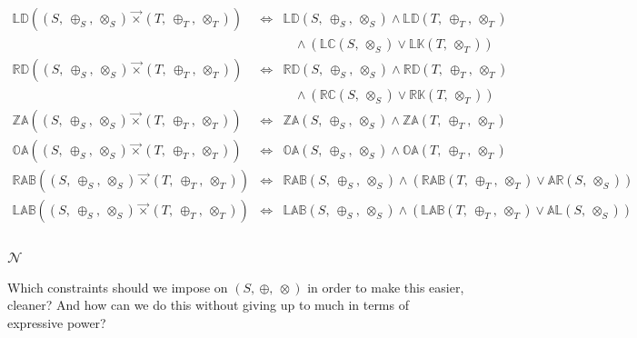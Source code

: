 \documentclass[10pt]{article}
\newcommand{\propname}[1]{{\mathbb{#1}}}
\newcommand{\lexprod}{\ensuremath{\mathbin{\vec{\times}}}}
\begin{document}
\[
\begin{array}{rcl} 
\propname{LD}((S,\ \oplus_S,\ \otimes_S) \lexprod (T,\ \oplus_T,\ \otimes_T)) 
   & \Leftrightarrow %
   & \propname{LD}(S,\ \oplus_S,\ \otimes_S) 
     \wedge \propname{LD}(T,\ \oplus_T,\ \otimes_T)\\ 
   & 
   & \ \ \ \ \wedge ( \propname{LC}(S,\ \otimes_S) \vee \propname{LK}(T,\ \otimes_T) )
  \\
\propname{RD}((S,\ \oplus_S,\ \otimes_S) \lexprod (T,\ \oplus_T,\ \otimes_T)) 
   & \Leftrightarrow %
  & \propname{RD}(S,\ \oplus_S,\ \otimes_S) 
    \wedge \propname{RD}(T,\ \oplus_T,\ \otimes_T) \\ 
   & 
   & \ \ \ \ \wedge ( \propname{RC}(S,\ \otimes_S) \vee \propname{RK}(T,\ \otimes_T) )
   \\ 
\propname{ZA}((S,\ \oplus_S,\ \otimes_S) \lexprod (T,\ \oplus_T,\ \otimes_T)) 
    & \Leftrightarrow %
    & \propname{ZA}(S,\ \oplus_S,\ \otimes_S) \wedge \propname{ZA}(T,\ \oplus_T,\ \otimes_T)
   \\
\propname{OA}((S,\ \oplus_S,\ \otimes_S) \lexprod (T,\ \oplus_T,\ \otimes_T)) 
    & \Leftrightarrow %
    & \propname{OA}(S,\ \oplus_S,\ \otimes_S) \wedge \propname{OA}(T,\ \oplus_T,\ \otimes_T)
   \\
\propname{RAB}((S,\ \oplus_S,\ \otimes_S) \lexprod (T,\ \oplus_T,\ \otimes_T)) 
    & \Leftrightarrow %
    & \propname{RAB}(S,\ \oplus_S,\ \otimes_S) \wedge  
      (\propname{RAB}(T,\ \oplus_T,\ \otimes_T) \vee \propname{AR}(S,\ \otimes_S)) 
    \\ 
\propname{LAB}((S,\ \oplus_S,\ \otimes_S) \lexprod (T,\ \oplus_T,\ \otimes_T)) 
    & \Leftrightarrow %
    & \propname{LAB}(S,\ \oplus_S,\ \otimes_S) \wedge  
      (\propname{LAB}(T,\ \oplus_T,\ \otimes_T) \vee \propname{AL}(S,\ \otimes_S)) 
    \\ 
\end{array} 
\]


\subsubsection{$\mathcal{N}$} 

Which constraints should we impose on $(S,\ \oplus,\ \otimes)$ in order 
to make this easier, cleaner? 
And how can we do this without giving up to much in terms of expressive power?
\end{document}
